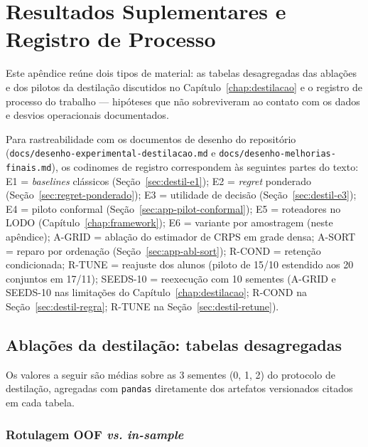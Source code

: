 \chapter{Resultados Suplementares e Registro de Processo}
\label{app:suplementares}

Este apêndice reúne dois tipos de material: as tabelas desagregadas
das ablações e dos pilotos da destilação discutidos no
Capítulo~\ref{chap:destilacao} e o registro de processo do trabalho
--- hipóteses que não sobreviveram ao contato com os dados e desvios
operacionais documentados.

Para rastreabilidade com os documentos de desenho do repositório
(\texttt{docs/\allowbreak desenho-\allowbreak experimental-\allowbreak destilacao.\allowbreak md} e
\texttt{docs/\allowbreak desenho-\allowbreak melhorias-\allowbreak finais.\allowbreak md}), os codinomes de registro
correspondem às seguintes partes do texto: E1 = \emph{baselines}
clássicos (Seção~\ref{sec:destil-e1}); E2 = \emph{regret} ponderado
(Seção~\ref{sec:regret-ponderado}); E3 = utilidade de decisão
(Seção~\ref{sec:destil-e3}); E4 = piloto conformal
(Seção~\ref{sec:app-pilot-conformal}); E5 = roteadores no LODO
(Capítulo~\ref{chap:framework}); E6 = variante por amostragem (neste
apêndice); A-GRID = ablação do estimador de CRPS em grade densa;
A-SORT = reparo por ordenação (Seção~\ref{sec:app-abl-sort}); R-COND =
retenção condicionada; R-TUNE = reajuste dos alunos (piloto de 15/10
estendido aos 20 conjuntos em 17/11); SEEDS-10 =
reexecução com 10 sementes (A-GRID e SEEDS-10 nas limitações do
Capítulo~\ref{chap:destilacao}; R-COND na Seção~\ref{sec:destil-regra};
R-TUNE na Seção~\ref{sec:destil-retune}).

\section{Ablações da destilação: tabelas desagregadas}
\label{sec:suple-ablacoes}

Os valores a seguir são médias sobre as 3 sementes (0, 1, 2) do
protocolo de destilação, agregadas com \texttt{pandas} diretamente dos
artefatos versionados citados em cada tabela.

\subsection{Rotulagem OOF \emph{vs.} \emph{in-sample}}

